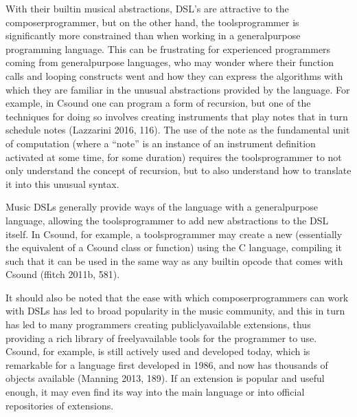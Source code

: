 \documentclass[letterpaper,10pt,english]{sphinxmanual}
\begin{document}
\sphinxAtStartPar
With their built\sphinxhyphen{}in musical abstractions, DSL’s are attractive to the composer\sphinxhyphen{}programmer,
but on the other hand, the tools\sphinxhyphen{}programmer is significantly more constrained than when
working in a general\sphinxhyphen{}purpose programming language.
This can be frustrating for experienced programmers coming from general\sphinxhyphen{}purpose languages,
who may wonder where their function calls and looping constructs went and how they can
express the algorithms with which they are familiar in the unusual abstractions provided by the language.
For example, in Csound one can program a form of recursion, but one of the techniques
for doing so involves creating instruments that play notes that in turn schedule notes (Lazzarini 2016, 116).
The use of the note as the fundamental
unit of computation (where a “note” is an instance of an instrument definition activated at
some time, for some duration) requires the tools\sphinxhyphen{}programmer to not only
understand the concept of recursion, but to also understand how to translate it
into this unusual syntax.

\sphinxAtStartPar
Music DSLs generally provide ways of  the language with
a general\sphinxhyphen{}purpose language, allowing the tools\sphinxhyphen{}programmer to add new abstractions to the DSL itself.
In Csound, for example, a tools\sphinxhyphen{}programmer may create a new  (essentially the equivalent
of a Csound class or function) using the C language,
compiling it such that it can be used in the same way as any built\sphinxhyphen{}in opcode that comes with Csound
(ffitch 2011b, 581).

\sphinxAtStartPar
It should also be noted that the ease with which composer\sphinxhyphen{}programmers can work
with DSLs has led to broad popularity in the music community, and this
in turn has led to many programmers creating publicly\sphinxhyphen{}available extensions, thus providing
a rich library of freely\sphinxhyphen{}available tools for the programmer to use.
Csound, for example, is still actively used and developed today, which is
remarkable for a language first developed in 1986, and now has thousands of objects available (Manning 2013, 189).
If an extension is popular and useful enough, it may even find its way into the
main language or into official repositories of extensions.
\end{document}
